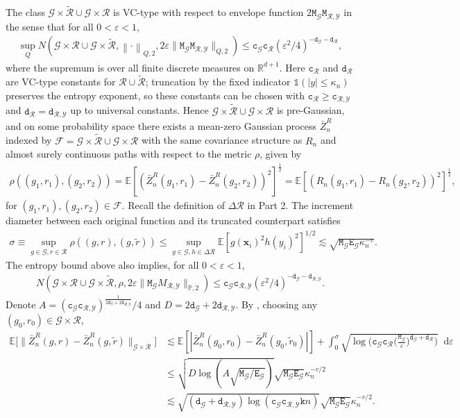 \documentclass[10pt]{article}
\renewcommand{\P}{\mathbb{P}}
\newcommand{\E}{\mathbb{E}}
\newcommand{\Indicator}{\mathds{1}}
\newcommand{\reals}{\mathbb{R}}
\newcommand{\dif}{\mathop{}\!\mathrm{d}}
\newcommand{\norm}[1]{\left\lVert#1\right\rVert}
\newcommand{\bx}{\mathbf{x}}
\newcommand{\F}{\mathcal{F}}
\newcommand{\G}{\mathcal{G}}
\newcommand{\R}{\mathcal{R}}
\newcommand{\Y}{\mathcal{Y}}
\newcommand{\ttc}{\mathtt{c}}
\newcommand{\ttd}{\mathtt{d}}
\newcommand{\ttE}{\mathtt{E}}
\newcommand{\ttk}{\mathtt{k}}
\newcommand{\ttM}{\mathtt{M}}
\begin{document}
The class $\G \times \tilde{\R} \cup \G \times \R$ is VC-type with respect to envelope function $2 \ttM_{\G} \ttM_{\R,\Y}$ in the sense that for all $0 <\varepsilon < 1$,
\begin{align*}
    \sup_{Q} N(\G \times \R \cup \G \times \tilde{\R}, \norm{\cdot}_{Q,2}, 2 \varepsilon \lVert \ttM_{\G} \ttM_{\R,\Y} \rVert_{Q,2}) \leq \ttc_{\G} \ttc_{\R} (\varepsilon^2/4)^{-\ttd_{\G}-\ttd_{\R}},
\end{align*}
where the supremum is over all finite discrete measures on $\reals^{d+1}$. Here $\ttc_{\R}$ and $\ttd_{\R}$ are VC-type constants for $\R\cup\tilde{\R}$; truncation by the fixed indicator $\Indicator(|y|\leq\kappa_n)$ preserves the entropy exponent, so these constants can be chosen with $\ttc_{\R}\geq \ttc_{\R,\Y}$ and $\ttd_{\R}=\ttd_{\R,\Y}$ up to universal constants. Hence $\G \times \tilde{\R} \cup \G \times \R$ is pre-Gaussian, and on some probability space there exists a mean-zero Gaussian process $\bar{Z}_n^R$ indexed by $\F = \G \times \tilde{\R} \cup \G \times \R$ with the same covariance structure as $R_n$ and almost surely continuous paths with respect to the metric $\rho$, given by
\begin{align*}
    \rho((g_1,r_1),(g_2,r_2)) =  \E[(\bar{Z}_n^R(g_1, r_1) - \bar{Z}_n^R(g_2, r_2))^2]^{\frac{1}{2}} = \E[(R_n(g_1, r_1) - R_n(g_2, r_2))^2]^{\frac{1}{2}},
\end{align*}
for $(g_1, r_1), (g_2, r_2) \in \F$. Recall the definition of $\Delta\R$ in Part 2. The increment diameter between each original function and its truncated counterpart satisfies
\begin{align*}
    \sigma \equiv \sup_{g \in \G, r \in \R}\rho((g,r),(g,\tilde r))
    \leq \sup_{g \in \G, h \in \Delta\R} \E[g(\bx_i)^2 h(y_i)^2]^{1/2}
    \lesssim \sqrt{\ttM_{\G} \ttE_{\G} \kappa_n^{-v}}.
\end{align*}
The entropy bound above also implies, for all $0 < \varepsilon < 1$,
\begin{align*}
    N(\G \times \R \cup \G \times \tilde{\R}, \rho, 2\varepsilon\lVert \ttM_{\G} M_{\R,\Y}\rVert_{\P,2})
    \leq \ttc_{\G} \ttc_{\R,\Y}(\varepsilon^2/4)^{-\ttd_{\G}-\ttd_{\R,\Y}}.
\end{align*}
Denote $A =  (\ttc_{\G} \ttc_{\R,\Y})^{\frac{1}{2 \ttd_{\G} + 2 \ttd_{\R,\Y}}}/4$ and $D = 2 \ttd_{\G} + 2 \ttd_{\R,\Y}$. By \citet[Corollary 2.2.8]{van-der-Vaart-Wellner_1996_Book}, choosing any $(g_0, r_0) \in \G \times \R$,
\begin{align*}
    \E\bigg[\lVert \bar{Z}_n^R(g,r) - \bar{Z}_n^R(g,\tilde{r}) \rVert_{\G \times \R}\bigg] & \lesssim \E \left[\left|\bar{Z}_n^R(g_0, r_0) - \bar{Z}_n^R(g_0, \tilde{r}_0)\right|\right] + \int_{0}^{\sigma} \sqrt{\log\Big( \ttc_{\G} \ttc_{\R}\big(\frac{\ttM_{\G}}{\varepsilon}\big)^{\ttd_{\G} + \ttd_{\R}}\Big)} \dif \varepsilon \\
    & \leq \sqrt{D \log (A \sqrt{\ttM_{\G}/\ttE_{\G}})} \sqrt{\ttM_{\G} \ttE_{\G}} \kappa_n^{-v/2} \\
    & \lesssim \sqrt{(\ttd_{\G} + \ttd_{\R,\Y}) \log(\ttc_{\G} \ttc_{\R,\Y} \ttk n)} \sqrt{\ttM_{\G} \ttE_{\G}} \kappa_n^{-v/2}.
\end{align*}
\end{document}
